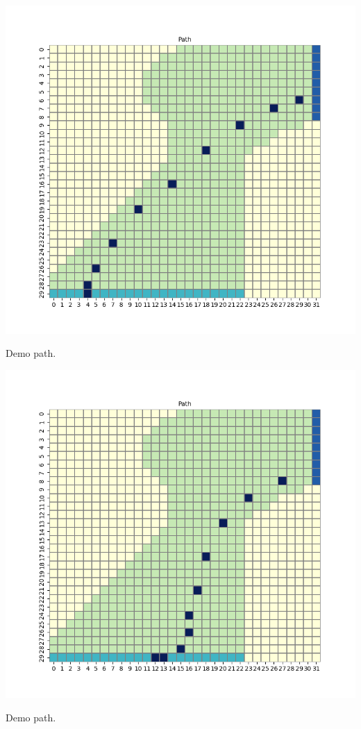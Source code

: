 \documentclass[11pt]{article}
\begin{document}
    \includegraphics[scale=0.7]{env3_demo_e_5_12_4}

    Demo path.


    \includegraphics[scale=0.7]{env3_demo_e_5_12_12}

    Demo path.
\end{document}
